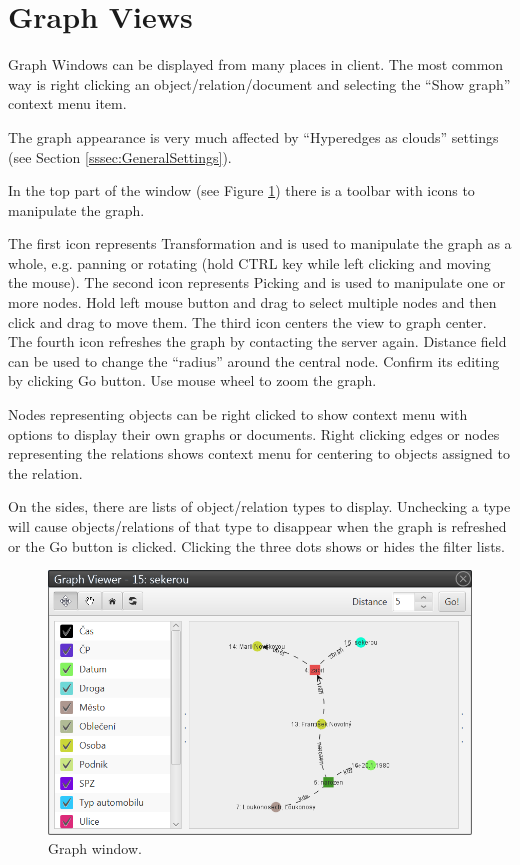 \section{Graph Views}
\label{ssec:Graphs}

Graph Windows can be displayed from many places in \textan{} client. The most
common way is right clicking an object/relation/document and selecting the ``Show
graph'' context menu item.

The graph appearance is very much affected by ``Hyperedges as clouds'' settings
(see Section \ref{sssec:GeneralSettings}).

In the top part of the window (see Figure \ref{fig:Graph}) there is a toolbar
with icons to manipulate the graph.

The first icon represents Transformation and is used to manipulate the graph as
a whole, e.g. panning or rotating (hold CTRL key while left clicking and moving
the mouse). The second icon represents Picking and is used to manipulate one or
more nodes. Hold left mouse button and drag to select multiple nodes and then
click and drag to move them. The third icon centers the view to graph center.
The fourth icon refreshes the graph by contacting the server again. Distance
field can be used to change the ``radius'' around the central node. Confirm its
editing by clicking Go button. Use mouse wheel to zoom the graph.

Nodes representing objects can be right clicked to show context menu with
options to display their own graphs or documents. Right clicking edges or
nodes representing the relations shows context menu for centering to objects
assigned to the relation.

On the sides, there are lists of object/relation types to display. Unchecking
a type will cause objects/relations of that type to disappear when the graph is
refreshed or the Go button is clicked. Clicking the three dots shows or hides the
filter lists.

\begin{figure}[!htb]
        \centering
        \includegraphics[width=\textwidth]{Images/graph}
        \caption{Graph window.}
        \label{fig:Graph}
\end{figure}

